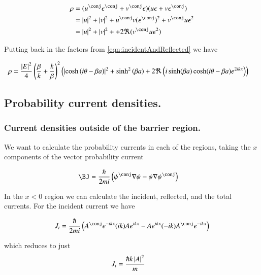 \documentclass{article}
\begin{document}
\begin{align*}
\rho 
&=
(u^\conj \epsilon^\conj + v^\conj \epsilon)
(u \epsilon + v \epsilon^\conj) \\
&= 
\Abs{u}^2 + \Abs{v}^2 + 
u^\conj v (\epsilon^\conj)^2 
+
v^\conj u \epsilon^2 \\
&=
\Abs{u}^2 + \Abs{v}^2 + 
+ 2 \Re(v^\conj u \epsilon^2) \\
\end{align*}

Putting back in the factors from \ref{eqn:incidentAndReflected} we have

\begin{align*}
\rho
&=
\frac{\left\lvert{E}\right\rvert^2}{4}
\left(
\frac{\beta}{k}
+\frac{k}{\beta}
\right)^2 
\left(
\left\lvert{\cosh\left( i\theta -\beta a \right)}\right\rvert^2
+\sinh^2\left( \beta a \right) 
+ 2 \Re\left( i \sinh(\beta a) \cosh(i\theta - \beta a) e^{2 i k x} \right)
\right)
\end{align*}

\subsection{ Probability current densities. }

\subsubsection{ Current densities outside of the barrier region. }

We want to calculate the probability currents in each of the regions, taking the $x$ components of the vector 
probability current

\begin{align}
\BJ
&=
\frac{\hbar}{2 m i}
\left(
\psi^\conj \grad \psi
-\psi \grad \psi^\conj
\right)
\end{align}

In the $x<0$ region we can calculate the incident, reflected, and the total currents.  For the incident current we have

\begin{align*}
J_i
&= \frac{\hbar}{2mi}\left( A^\conj e^{-i k x} (ik)A e^{i k x} -Ae^{i k x} (-ik)A^\conj e^{-i k x} \right) \\
\end{align*}

which reduces to just
\begin{align}
J_i &= \frac{\hbar k \left\lvert{A}\right\rvert^2 }{m}
\end{align}
\end{document}

